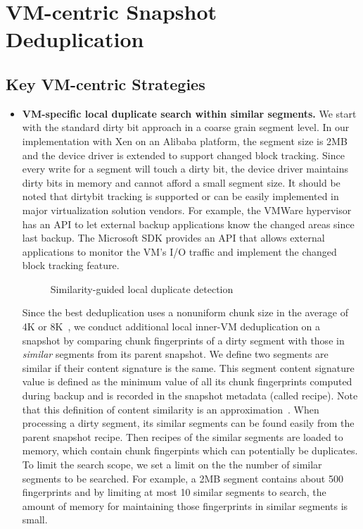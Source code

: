 \section{VM-centric Snapshot Deduplication}
\label{sect:deduplication}

\subsection{Key VM-centric  Strategies}
\label{sect:vc-strategies}
\begin{itemize}
\item \textbf{VM-specific local duplicate search within similar segments.}
We start with the standard dirty bit approach in a coarse grain segment level.
In our implementation with Xen on an Alibaba platform, the segment size is 2MB
and  the device driver is extended to support  changed block tracking. 
Since every write for a segment will touch a dirty bit, the device driver maintains dirty bits in memory
and cannot afford a small segment  size.
It should be noted that dirtybit tracking is supported or can be easily implemented in 
major virtualization solution vendors. For example,
the VMWare hypervisor has an API to let external backup applications know 
the changed areas since last backup. 
The Microsoft SDK provides an API that allows external applications to monitor 
the VM's I/O traffic and implement  the changed block tracking feature.

\begin{figure}[htbp]
  \centering
  \caption{Similarity-guided local duplicate detection}
  \label{fig:local_dedup}
\end{figure}

Since the best deduplication uses a nonuniform chunk size 
in the average of 4K or 8K~\cite{Jin2009},
we conduct additional local inner-VM deduplication on a snapshot by comparing
chunk fingerprints of a dirty segment 
with those in  {\em similar} segments from its parent snapshot. 
We define two segments are similar if their content signature is the same.
This segment content signature value is defined as the minimum value of all its chunk fingerprints 
computed during backup and is recorded in the snapshot metadata (called recipe). Note that this definition of
content similarity is  an approximation~\cite{AdnriBroader}.  When processing a dirty segment,
its  similar segments can be found easily from the
parent snapshot recipe.  Then recipes of the similar segments are loaded to memory,
which contain chunk fingerpints which can  potentially be duplicates.
To limit the search scope, we set a limit on the the number of  similar segments to be  searched. 
For example, a 2MB segment contains about 500 fingerprints and by limiting at most 10 similar
segments to search, the amount of memory for maintaining those fingerprints in similar segments is small.


\end{itemize}
